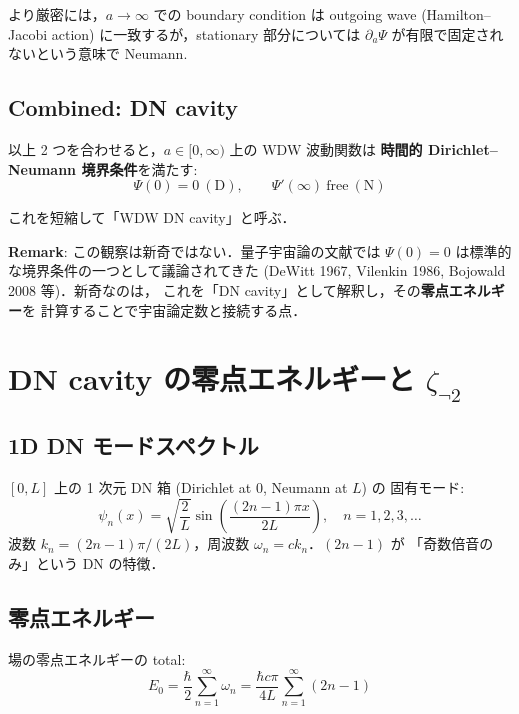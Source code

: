 \documentclass[11pt,a4paper]{article}
\begin{document}
より厳密には，$a\to\infty$ での boundary condition は outgoing wave
(Hamilton--Jacobi action) に一致するが，stationary 部分については
$\partial_a\Psi$ が有限で固定されないという意味で Neumann.

\subsection{Combined: DN cavity}

以上 2 つを合わせると，$a \in [0, \infty)$ 上の WDW 波動関数は
\textbf{時間的 Dirichlet--Neumann 境界条件}を満たす:
\begin{equation}
\boxed{\Psi(0) = 0\ (\text{D}), \qquad \Psi'(\infty)\ \text{free}\ (\text{N})}
\end{equation}

これを短縮して「WDW DN cavity」と呼ぶ．

\begin{tcolorbox}[colback=blue!5,colframe=blue!50!black]
\textbf{Remark}: この観察は新奇ではない．量子宇宙論の文献では
$\Psi(0)=0$ は標準的な境界条件の一つとして議論されてきた
(DeWitt 1967, Vilenkin 1986, Bojowald 2008 等)．新奇なのは，
これを「DN cavity」として解釈し，その\textbf{零点エネルギー}を
計算することで宇宙論定数と接続する点．
\end{tcolorbox}

\section{DN cavity の零点エネルギーと $\zeta_{\neg 2}$}

\subsection{1D DN モードスペクトル}

$[0, L]$ 上の 1 次元 DN 箱 (Dirichlet at $0$, Neumann at $L$) の
固有モード:
\begin{equation}
\psi_n(x) = \sqrt{\frac{2}{L}}\sin\left(\frac{(2n-1)\pi x}{2L}\right), \quad n=1,2,3,\ldots
\end{equation}
波数 $k_n = (2n-1)\pi/(2L)$，周波数 $\omega_n = c k_n$．$(2n-1)$ が
「奇数倍音のみ」という DN の特徴．

\subsection{零点エネルギー}

場の零点エネルギーの total:
\begin{equation}
E_0 = \frac{\hbar}{2}\sum_{n=1}^\infty \omega_n
= \frac{\hbar c \pi}{4L}\sum_{n=1}^\infty (2n-1)
\end{equation}
\end{document}
